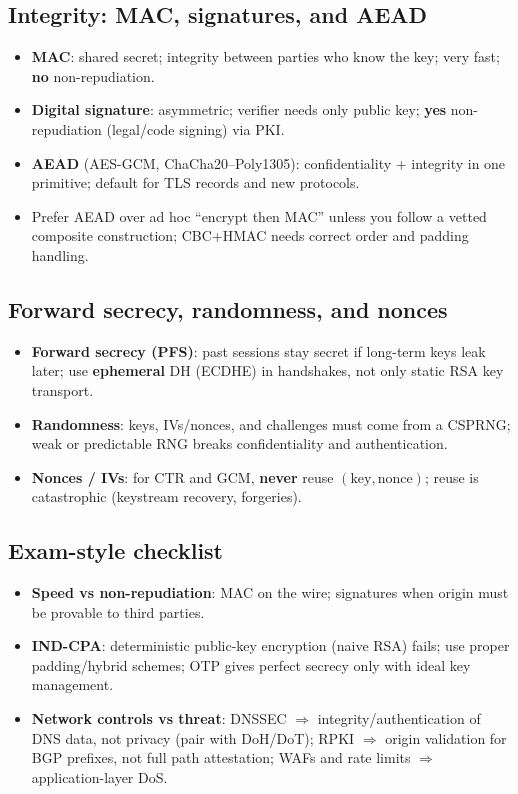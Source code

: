 \documentclass[12pt]{article}
\begin{document}
\subsection{Integrity: MAC, signatures, and AEAD}
\begin{itemize}
  \item \textbf{MAC}: shared secret; integrity between parties who know the key; very fast; \textbf{no} non-repudiation.
  \item \textbf{Digital signature}: asymmetric; verifier needs only public key; \textbf{yes} non-repudiation (legal/code signing) via PKI.
  \item \textbf{AEAD} (AES-GCM, ChaCha20--Poly1305): confidentiality + integrity in one primitive; default for TLS records and new protocols.
  \item Prefer AEAD over ad hoc ``encrypt then MAC'' unless you follow a vetted composite construction; CBC+HMAC needs correct order and padding handling.
\end{itemize}

\subsection{Forward secrecy, randomness, and nonces}
\begin{itemize}
  \item \textbf{Forward secrecy (PFS)}: past sessions stay secret if long-term keys leak later; use \textbf{ephemeral} DH (ECDHE) in handshakes, not only static RSA key transport.
  \item \textbf{Randomness}: keys, IVs/nonces, and challenges must come from a CSPRNG; weak or predictable RNG breaks confidentiality and authentication.
  \item \textbf{Nonces / IVs}: for CTR and GCM, \textbf{never} reuse $(\text{key}, \text{nonce})$; reuse is catastrophic (keystream recovery, forgeries).
\end{itemize}

\subsection{Exam-style checklist}
\begin{itemize}
  \item \textbf{Speed vs non-repudiation}: MAC on the wire; signatures when origin must be provable to third parties.
  \item \textbf{IND-CPA}: deterministic public-key encryption (naive RSA) fails; use proper padding/hybrid schemes; OTP gives perfect secrecy only with ideal key management.
  \item \textbf{Network controls vs threat}: DNSSEC $\Rightarrow$ integrity/authentication of DNS data, not privacy (pair with DoH/DoT); RPKI $\Rightarrow$ origin validation for BGP prefixes, not full path attestation; WAFs and rate limits $\Rightarrow$ application-layer DoS.
\end{itemize}
\end{document}
